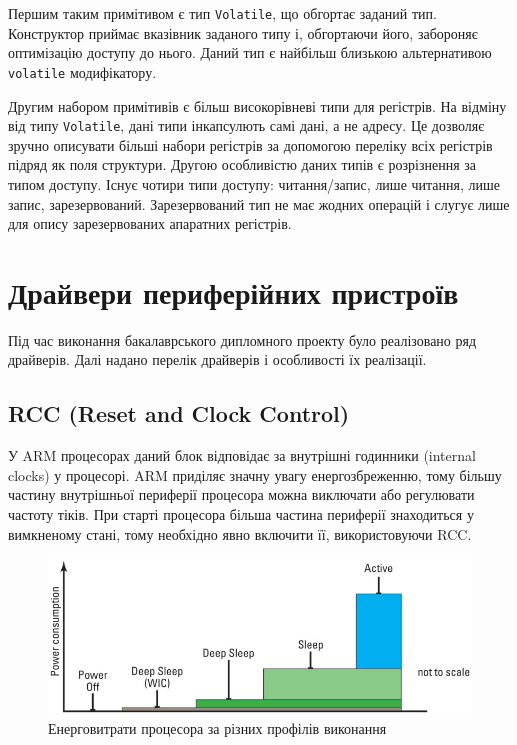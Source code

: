 \documentclass[oneside,14pt,a4paper,final]{myextreport}
\newcommand\code[1]{{\tt #1}}
\begin{document}
Першим таким примітивом є тип \code{Volatile}, що обгортає заданий тип. Конструктор приймає вказівник заданого типу і, обгортаючи його, забороняє оптимізацію доступу до нього. Даний тип є найбільш близькою альтернативою \code{volatile} модифікатору.

Другим набором примітивів є більш високорівневі типи для регістрів. На відміну від типу \code{Volatile}, дані типи інкапсулють самі дані, а не адресу. Це дозволяє зручно описувати більші набори регістрів за допомогою переліку всіх регістрів підряд як поля структури. Другою особливістю даних типів є розрізнення за типом доступу. Існує чотири типи доступу: читання/запис, лише читання, лише запис, зарезервований. Зарезервований тип не має жодних операцій і слугує лише для опису зарезервованих апаратних регістрів.

\section{Драйвери периферійних пристроїв}

Під час виконання бакалаврського дипломного проекту було реалізовано ряд драйверів. Далі надано перелік драйверів і особливості їх реалізації.

\subsection{RCC (Reset and Clock Control)}

  У ARM процесорах даний блок відповідає за внутрішні годинники (internal clocks) у процесорі. ARM приділяє значну увагу енергозбреженню, тому більшу частину внутрішньої периферії процесора можна виключати або регулювати частоту тіків. При старті процесора більша частина периферії знаходиться у вимкненому стані, тому необхідно явно включити її, використовуючи RCC.

\begin{figure}[h]
  \includegraphics[width=\textwidth]{power-consumption}
  \caption{Енерговитрати процесора за різних профілів виконання}
\end{figure}
\end{document}
